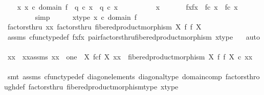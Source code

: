 \begin{isabellebody}
\isanewline
\ \ \isamarkupfalse%
\ {\isachardoublequoteopen}{\isasymAnd}x{\isachardot}{\kern0pt}\ x\ {\isasymin}\isactrlsub c\ domain\ f\ {\isasymLongrightarrow}\ q{}\ {\isasymcirc}\isactrlsub c\ x\ {\isacharequal}{\kern0pt}\ q{}\ {\isasymcirc}\isactrlsub c\ x{\isachardoublequoteclose}\isanewline
\ \ \isamarkupfalse%
\ {\isacharminus}{\kern0pt}\isanewline
\ \ \ \ \isamarkupfalse%
\ x\ \isanewline
\ \ \ \ \isamarkupfalse%
\ fxfx{\isacharcolon}{\kern0pt}\ \ {\isachardoublequoteopen}f{\isasymcirc}\isactrlsub c\ x\ {\isacharequal}{\kern0pt}\ f{\isasymcirc}\isactrlsub c\ x{\isachardoublequoteclose}\isanewline
\ \ \ \ \ \ \ \isamarkupfalse%
\ simp\isanewline
\ \ \ \ \isamarkupfalse%
\ x{\isacharunderscore}{\kern0pt}type{\isacharcolon}{\kern0pt}\ {\isachardoublequoteopen}x\ {\isasymin}\isactrlsub c\ domain\ f{\isachardoublequoteclose}\isanewline
\ \ \ \ \isamarkupfalse%
\ factorsthru{\isacharcolon}{\kern0pt}\ {\isachardoublequoteopen}{\isasymlangle}x{\isacharcomma}{\kern0pt}x{\isasymrangle}\ factorsthru\ fibered{\isacharunderscore}{\kern0pt}product{\isacharunderscore}{\kern0pt}morphism\ X\ f\ f\ X{\isachardoublequoteclose}\isanewline
\ \ \ \ \ \ \isamarkupfalse%
\ assms{\isacharparenleft}{\kern0pt}{}{\isacharparenright}{\kern0pt}\ cfunc{\isacharunderscore}{\kern0pt}type{\isacharunderscore}{\kern0pt}def\ fxfx\ pair{\isacharunderscore}{\kern0pt}factorsthru{\isacharunderscore}{\kern0pt}fibered{\isacharunderscore}{\kern0pt}product{\isacharunderscore}{\kern0pt}morphism\ x{\isacharunderscore}{\kern0pt}type\ \ \isamarkupfalse%
\ auto\isanewline
\ \ \ \ \isamarkupfalse%
\ \isamarkupfalse%
\ xx\ \ xx{\isacharunderscore}{\kern0pt}assms{\isacharcolon}{\kern0pt}\ {\isachardoublequoteopen}xx\ {\isacharcolon}{\kern0pt}\ one\ {\isasymrightarrow}\ X\ \isactrlbsub f\isactrlesub {\isasymtimes}\isactrlsub c\isactrlbsub f\isactrlesub \ X{\isachardoublequoteclose}\ {\isachardoublequoteopen}{\isasymlangle}x{\isacharcomma}{\kern0pt}x{\isasymrangle}\ {\isacharequal}{\kern0pt}\ fibered{\isacharunderscore}{\kern0pt}product{\isacharunderscore}{\kern0pt}morphism\ X\ f\ f\ X\ {\isasymcirc}\isactrlsub c\ xx{\isachardoublequoteclose}\isanewline
\ \ \ \ \ \ \isamarkupfalse%
\ {\isacharparenleft}{\kern0pt}smt\ assms{\isacharparenleft}{\kern0pt}{}{\isacharparenright}{\kern0pt}\ cfunc{\isacharunderscore}{\kern0pt}type{\isacharunderscore}{\kern0pt}def\ diag{\isacharunderscore}{\kern0pt}on{\isacharunderscore}{\kern0pt}elements\ diagonal{\isacharunderscore}{\kern0pt}type\ domain{\isacharunderscore}{\kern0pt}comp\ factors{\isacharunderscore}{\kern0pt}through{\isacharunderscore}{\kern0pt}def\ factorsthru\ fibered{\isacharunderscore}{\kern0pt}product{\isacharunderscore}{\kern0pt}morphism{\isacharunderscore}{\kern0pt}type\ x{\isacharunderscore}{\kern0pt}type{\isacharparenright}{\kern0pt}\isanewline

\end{isabellebody}
